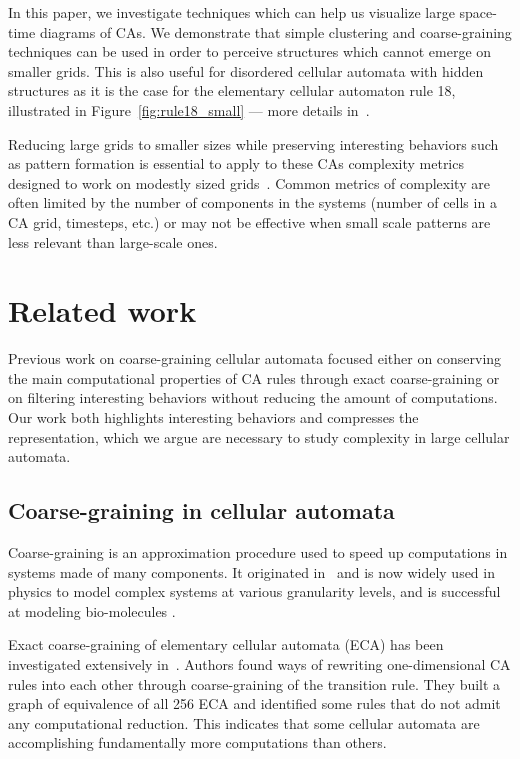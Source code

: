 In this paper, we investigate techniques which can help us visualize large
space-time diagrams of CAs. We demonstrate that simple clustering and
coarse-graining techniques can be used in order to perceive structures which
cannot emerge on smaller grids. This is also useful for disordered cellular
automata with hidden structures as it is the case for the elementary cellular
automaton rule 18, illustrated in Figure~\ref{fig:rule18_small} --- more details
in~.

Reducing large grids to smaller sizes while preserving interesting behaviors
such as pattern formation is essential to apply to these CAs complexity metrics
designed to work on modestly sized
grids~\cite{grassbergerQuantitativeTheorySelfgenerated1986,
  zenilCompressionBasedInvestigationDynamical2010,
  soler-toscanoCalculatingKolmogorovComplexity2014,
  zenilTwodimensionalKolmogorovComplexity2015}. Common metrics of complexity are
often limited by the number of components in the systems (number of cells in a
CA grid, timesteps, etc.) or may not be effective when small scale patterns are
less relevant than large-scale ones.

\section{Related work}

Previous work on coarse-graining cellular automata focused either on conserving
the main computational properties of CA rules through exact coarse-graining or
on filtering interesting behaviors without reducing the amount of computations.
Our work both highlights interesting behaviors and compresses the
representation, which we argue are necessary to study complexity in large
cellular automata.

\subsection{Coarse-graining in cellular automata}
Coarse-graining is an approximation procedure used to speed up computations in
systems made of many components. It originated
in~\cite{levittComputerSimulationProtein1975} and is now widely used in physics
to model complex systems at various granularity levels, and is successful at
modeling bio-molecules \cite{potoyanRecentSuccessesCoarsegrained2013,
  ingolfssonPowerCoarseGraining2014, kmiecikCoarseGrainedProteinModels2016}.

Exact coarse-graining of elementary cellular automata (ECA) has been
investigated extensively
in~\cite{israeliComputationalIrreducibilityPredictability2004,
  israeliCoarsegrainingCellularAutomata2006}. Authors found ways of rewriting
one-dimensional CA rules into each other through coarse-graining of the
transition rule. They built a graph of equivalence of all 256 ECA and identified
some rules that do not admit any computational reduction. This indicates that
some cellular automata are accomplishing fundamentally more computations than
others.

